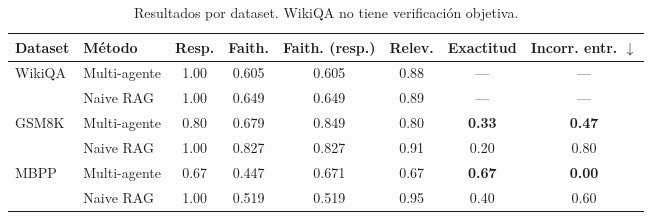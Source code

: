 \begin{table}[ht]
\centering
\caption{Resultados por dataset. WikiQA no tiene verificación objetiva.}\label{tab:dataset}
\small
\setlength{\tabcolsep}{4pt}
\begin{tabular}{@{}llcccccc@{}}
\toprule
Dataset & Método & Resp. & Faith. & Faith. (resp.) & Relev. & Exactitud & Incorr. entr. $\downarrow$ \\
\midrule
\multirow{2}{*}{WikiQA}
 & Multi-agente & 1.00 & 0.605 & 0.605 & 0.88 & --- & --- \\
 & Naive RAG    & 1.00 & 0.649 & 0.649 & 0.89 & --- & --- \\
\midrule
\multirow{2}{*}{GSM8K}
 & Multi-agente & 0.80 & 0.679 & 0.849 & 0.80 & \textbf{0.33} & \textbf{0.47} \\
 & Naive RAG    & 1.00 & 0.827 & 0.827 & 0.91 & 0.20 & 0.80 \\
\midrule
\multirow{2}{*}{MBPP}
 & Multi-agente & 0.67 & 0.447 & 0.671 & 0.67 & \textbf{0.67} & \textbf{0.00} \\
 & Naive RAG    & 1.00 & 0.519 & 0.519 & 0.95 & 0.40 & 0.60 \\
\bottomrule
\end{tabular}
\end{table}

